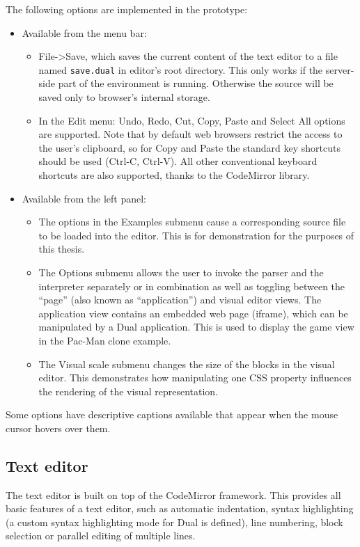 The following options are implemented in the prototype:
\begin{itemize}
    \item Available from the menu bar:
    \begin{itemize}
        \item File->Save, which saves the current content of the text editor to
          a file named \texttt{save.dual} in editor's root directory. This only
          works if the server-side part of the environment is running. Otherwise
          the source will be saved only to browser's internal storage.
        \item In the Edit menu: Undo, Redo, Cut, Copy, Paste and Select All
          options are supported. Note that by default web browsers restrict the
          access to the user's clipboard, so for Copy and Paste the standard key
          shortcuts should be used (Ctrl-C, Ctrl-V). All other conventional
          keyboard shortcuts are also supported, thanks to the CodeMirror
          library.
    \end{itemize}
    \item Available from the left panel:
    \begin{itemize}
        \item The options in the Examples submenu cause a corresponding source
          file to be loaded into the editor. This is for demonstration for the
          purposes of this thesis.
        \item The Options submenu allows the user to invoke the parser and the
          interpreter separately or in combination as well as toggling between
          the ``page'' (also known as ``application'') and visual editor
          views. The application view contains an embedded web page (iframe),
          which can be manipulated by a Dual application. This is used to
          display the game view in the Pac-Man clone example.
        \item The Visual scale submenu changes the size of the blocks in the
          visual editor. This demonstrates how manipulating one CSS property
          influences the rendering of the visual representation.
    \end{itemize}
\end{itemize}

Some options have descriptive captions available that appear when the mouse
cursor hovers over them.

\subsection{Text editor}
The text editor is built on top of the CodeMirror framework\cite{codemirror_site}. This provides all basic features of a text editor, such as automatic indentation, syntax highlighting (a custom syntax highlighting mode for Dual is defined), line numbering, block selection or parallel editing of multiple lines.

